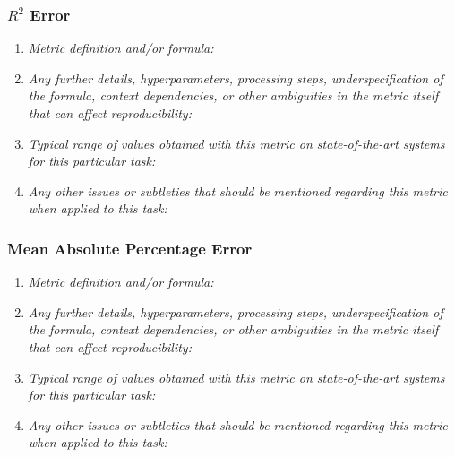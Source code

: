 \documentclass[a4paper,11pt]{article}
\begin{document}
        \subsubsection{$R^2$ Error}
            \begin{enumerate}[label=\alph*.]
                \item \textit{Metric definition and/or formula:}
                \bigskip
                \item \textit{Any further details, hyperparameters, processing steps, underspecification of the formula, context dependencies, or other ambiguities in the metric itself that can affect reproducibility:}
                \bigskip
                \item \textit{Typical range of values obtained with this metric on state-of-the-art systems for this particular task:}
                \bigskip
                \item \textit{Any other issues or subtleties that should be mentioned regarding this metric when applied to this task:}
                \bigskip
            \end{enumerate}
        \subsubsection{Mean Absolute Percentage Error}
            \begin{enumerate}[label=\alph*.]
                \item \textit{Metric definition and/or formula:}
                \bigskip
                \item \textit{Any further details, hyperparameters, processing steps, underspecification of the formula, context dependencies, or other ambiguities in the metric itself that can affect reproducibility:}
                \bigskip
                \item \textit{Typical range of values obtained with this metric on state-of-the-art systems for this particular task:}
                \bigskip
                \item \textit{Any other issues or subtleties that should be mentioned regarding this metric when applied to this task:}
                \bigskip
            \end{enumerate}
\end{document}
